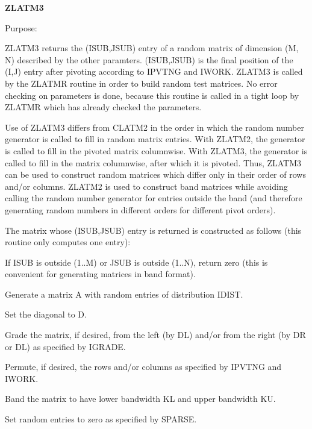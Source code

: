 {\bfseries Z\+L\+A\+T\+M3} 

\begin{DoxyParagraph}{Purpose\+: }
\begin{DoxyVerb}    ZLATM3 returns the (ISUB,JSUB) entry of a random matrix of
    dimension (M, N) described by the other paramters. (ISUB,JSUB)
    is the final position of the (I,J) entry after pivoting
    according to IPVTNG and IWORK. ZLATM3 is called by the
    ZLATMR routine in order to build random test matrices. No error
    checking on parameters is done, because this routine is called in
    a tight loop by ZLATMR which has already checked the parameters.

    Use of ZLATM3 differs from CLATM2 in the order in which the random
    number generator is called to fill in random matrix entries.
    With ZLATM2, the generator is called to fill in the pivoted matrix
    columnwise. With ZLATM3, the generator is called to fill in the
    matrix columnwise, after which it is pivoted. Thus, ZLATM3 can
    be used to construct random matrices which differ only in their
    order of rows and/or columns. ZLATM2 is used to construct band
    matrices while avoiding calling the random number generator for
    entries outside the band (and therefore generating random numbers
    in different orders for different pivot orders).

    The matrix whose (ISUB,JSUB) entry is returned is constructed as
    follows (this routine only computes one entry):

      If ISUB is outside (1..M) or JSUB is outside (1..N), return zero
         (this is convenient for generating matrices in band format).

      Generate a matrix A with random entries of distribution IDIST.

      Set the diagonal to D.

      Grade the matrix, if desired, from the left (by DL) and/or
         from the right (by DR or DL) as specified by IGRADE.

      Permute, if desired, the rows and/or columns as specified by
         IPVTNG and IWORK.

      Band the matrix to have lower bandwidth KL and upper
         bandwidth KU.

      Set random entries to zero as specified by SPARSE.\end{DoxyVerb}
 
\end{DoxyParagraph}

